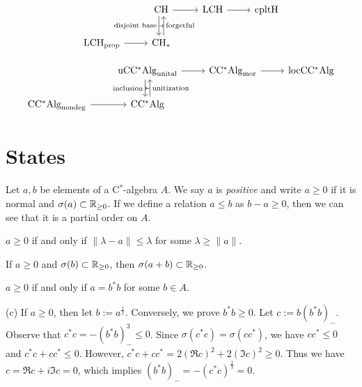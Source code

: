 \documentclass{../../large}
\begin{document}
\begin{prb}
\[\begin{tikzcd}
& \mathrm{CH} \rar\dar[shift right, swap]{\text{disjoint base}} &
\mathrm{LCH} \rar &
\mathrm{cpltH} \\
\mathrm{LCH}_{\mathrm{prop}} \rar &
\mathrm{CH}_* \uar[shift right,swap]{\text{forgetful}} \uar[phantom]{\scriptscriptstyle\boldsymbol{\dashv}}
\end{tikzcd}\]

\[\begin{tikzcd}
& \mathrm{uCC^*Alg}_{\mathrm{unital}} \rar\dar[shift right, swap]{\text{inclusion}} &
\mathrm{CC^*Alg}_{\mathrm{mor}} \rar &
\mathrm{locCC^*Alg} \\
\mathrm{CC^*Alg}_{\mathrm{nondeg}} \rar &
\mathrm{CC^*Alg} \uar[shift right,swap]{\text{unitization}} \uar[phantom]{\scriptscriptstyle\boldsymbol{\vdash}}
\end{tikzcd}\]
\end{prb}


\section{States}


\begin{prb}
Let $a,b$ be elements of a C$^*$-algebra $A$.
We say $a$ is \emph{positive} and write $a\ge0$ if it is normal and $\sigma(a)\subset\mathbb{R}_{\ge0}$.
If we define a relation $a\le b$ as $b-a\ge0$, then we can see that it is a partial order on $A$.
\begin{parts}
\item $a\ge0$ if and only if $\|\lambda-a\|\le\lambda$ for some $\lambda\ge\|a\|$.
\item If $a\ge0$ and $\sigma(b)\subset\mathbb{R}_{\ge0}$, then $\sigma(a+b)\subset\mathbb{R}_{\ge0}$.
\item $a\ge0$ if and only if $a=b^*b$ for some $b\in A$.
\end{parts}
\end{prb}
\begin{pf}
(c)
If $a\ge0$, then let $b:=a^{\frac12}$.
Conversely, we prove $b^*b\ge0$.
Let $c:=b(b^*b)_-$.
Observe that $c^*c=-(b^*b)_-^3\le0$.
Since $\sigma(c^*c)=\sigma(cc^*)$, we have $cc^*\le0$ and $c^*c+cc^*\le0$.
However, $c^*c+cc^*=2(\Re c)^2+2(\Im c)^2\ge0$.
Thus we have $c=\Re c+i\Im c=0$, which implies $(b^*b)_-=-(c^*c)^{\frac13}=0$.
\end{pf}

\end{document}

